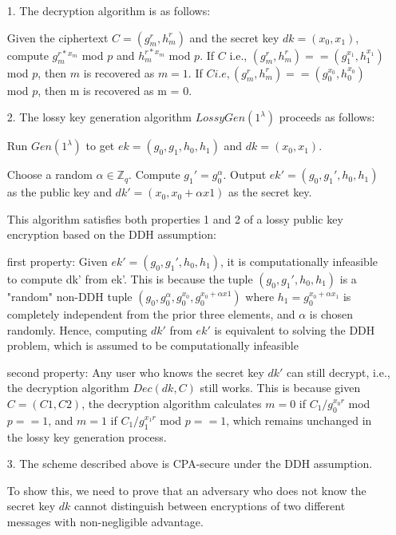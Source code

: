 \begin{itemize}
	\item [1.]
    The decryption algorithm is as follows:


    Given the ciphertext $C=(g_m^r, h_m^r)$ and the secret key $dk=(x_0, x_1)$, compute $g_m^{r * x_m}$ mod $p$ and $h_m^{r *x_m}$ mod $p$.
    If $C$ i.e., $(g_m^r, h_m^r) == (g_1^{x_1}, h_1^{x_1})$ mod $p$, then $m$ is recovered as $m = 1$.
     If $C i.e, (g_m^r, h_m^r) == (g_0^{x_0}, h_0^{x_0})$ mod $p$, then m is recovered as m = 0.

    \item [2.]
    The lossy key generation algorithm $LossyGen(1^\lambda)$ proceeds as follows:

    Run $Gen(1^\lambda)$ to get $ek = (g_0, g_1, h_0, h_1)$ and $dk = (x_0, x_1)$.

    Choose a random $ \alpha \in \mathbb{Z}_q$.
    Compute $g_1' = g_0^\alpha$.
    Output $ek' = (g_0, g_1', h_0, h_1)$ as the public key and $dk' = (x_0, x_0 + \alpha x1)$ as the secret key.

    This algorithm satisfies both properties 1 and 2 of a lossy public key encryption based on the DDH assumption:

    
    first property: 
        Given $ek' = (g_0, g_1', h_0, h_1)$, it is computationally infeasible to compute dk' from ek'.
         This is because the tuple $(g_0, g_1', h_0, h_1)$ is a "random" non-DDH tuple $(g_0, g_0^\alpha, g_0^{x_0}, g_0^{x_0 + \alpha x1})$ 
         where $h_1 = g_0^{x_0 + \alpha x_1}$ is completely independent from the prior three elements, and $\alpha$ is chosen randomly.
          Hence, computing $dk'$ from $ek'$ is equivalent to solving the DDH problem, which is assumed to be computationally infeasible
    
        second property: Any user who knows the secret key $dk'$ can still decrypt, i.e., 
        the decryption algorithm $Dec(dk, C)$ still works. This is because given $C = (C1, C2)$, 
        the decryption algorithm calculates $m = 0$ if $C_1/g_0^{x_0 r}$ mod $p == 1$, and $m = 1$ if $C_1/g_1^{x_1 r}$ mod $p == 1$,
        which remains unchanged in the lossy key generation process.

    \item [3.]
        The scheme described above is CPA-secure under the DDH assumption. 
        
        To show this, we need to prove that an adversary who does not know the secret key $dk$
         cannot distinguish between encryptions of two different messages with non-negligible advantage.


\end{itemize}

